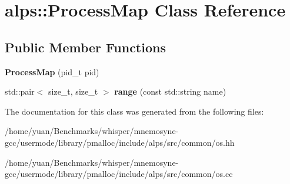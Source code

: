 \hypertarget{classalps_1_1ProcessMap}{}\section{alps\+:\+:Process\+Map Class Reference}
\label{classalps_1_1ProcessMap}
\subsection*{Public Member Functions}
\begin{DoxyCompactItemize}
\item 
{\bfseries Process\+Map} (pid\+\_\+t pid)\hypertarget{classalps_1_1ProcessMap_af5fb1aac3fccdfe185ab9eaaca4deb23}{}\label{classalps_1_1ProcessMap_af5fb1aac3fccdfe185ab9eaaca4deb23}

\item 
std\+::pair$<$ size\+\_\+t, size\+\_\+t $>$ {\bfseries range} (const std\+::string name)\hypertarget{classalps_1_1ProcessMap_a788dce0ccbd6e9270492230f04cad506}{}\label{classalps_1_1ProcessMap_a788dce0ccbd6e9270492230f04cad506}

\end{DoxyCompactItemize}


The documentation for this class was generated from the following files\+:\begin{DoxyCompactItemize}
\item 
/home/yuan/\+Benchmarks/whisper/mnemosyne-\/gcc/usermode/library/pmalloc/include/alps/src/common/os.\+hh\item 
/home/yuan/\+Benchmarks/whisper/mnemosyne-\/gcc/usermode/library/pmalloc/include/alps/src/common/os.\+cc\end{DoxyCompactItemize}

